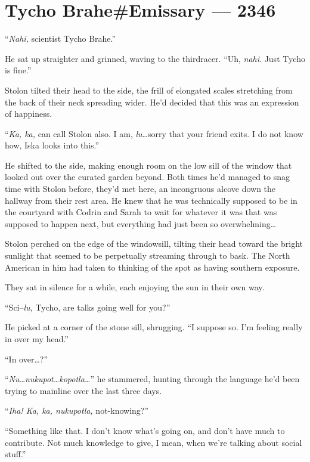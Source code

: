 \hypertarget{tycho-braheemissary-2346}{%
\chapter{Tycho Brahe\#Emissary — 2346}\label{tycho-braheemissary-2346}}

``\emph{Nahi,} scientist Tycho Brahe.''

He sat up straighter and grinned, waving to the thirdracer. ``Uh, \emph{nahi}. Just Tycho is fine.''

Stolon tilted their head to the side, the frill of elongated scales stretching from the back of their neck spreading wider. He'd decided that this was an expression of happiness.

``\emph{Ka, ka,} can call Stolon also. I am, \emph{lu}\ldots sorry that your friend exits. I do not know how, Iska looks into this.''

He shifted to the side, making enough room on the low sill of the window that looked out over the curated garden beyond. Both times he'd managed to snag time with Stolon before, they'd met here, an incongruous alcove down the hallway from their rest area. He knew that he was technically supposed to be in the courtyard with Codrin and Sarah to wait for whatever it was that was supposed to happen next, but everything had just been so overwhelming\ldots{}

Stolon perched on the edge of the windowsill, tilting their head toward the bright sunlight that seemed to be perpetually streaming through to bask. The North American in him had taken to thinking of the spot as having southern exposure.

They sat in silence for a while, each enjoying the sun in their own way.

``Sci--\emph{lu,} Tycho, are talks going well for you?''

He picked at a corner of the stone sill, shrugging. ``I suppose so. I'm feeling really in over my head.''

``In over\ldots?''

``\emph{Nu\ldots nukupot\ldots kopotla\ldots{}}'' he stammered, hunting through the language he'd been trying to mainline over the last three days.

``\emph{Iha! Ka, ka, nukupotla,} not-knowing?''

``Something like that. I don't know what's going on, and don't have much to contribute. Not much knowledge to give, I mean, when we're talking about social stuff.''

